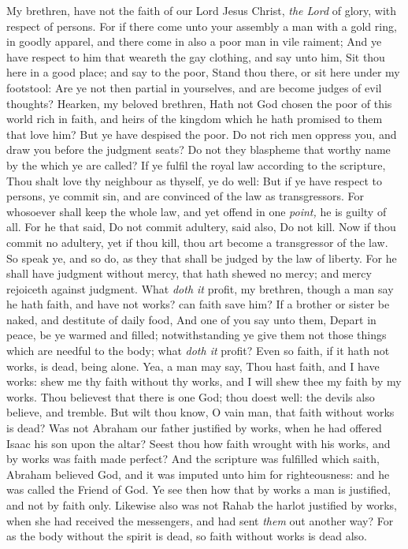 \documentclass[11pt,letterpaper,oneside]{memoir}
\begin{document}
My brethren, have not the faith of our Lord Jesus Christ, \emph{the Lord} of 
glory, with respect of persons. For if there come unto your assembly a 
man with a gold ring, in goodly apparel, and there come in also a poor 
man in vile raiment; And ye have respect to him that weareth the gay 
clothing, and say unto him, Sit thou here in a good place; and say to 
the poor, Stand thou there, or sit here under my footstool: Are ye not 
then partial in yourselves, and are become judges of evil thoughts? 
Hearken, my beloved brethren, Hath not God chosen the poor of this world 
rich in faith, and heirs of the kingdom which he hath promised to them 
that love him? But ye have despised the poor. Do not rich men oppress 
you, and draw you before the judgment seats? Do not they blaspheme that 
worthy name by the which ye are called? If ye fulfil the royal law 
according to the scripture, Thou shalt love thy neighbour as thyself, ye 
do well: But if ye have respect to persons, ye commit sin, and are 
convinced of the law as transgressors. For whosoever shall keep the 
whole law, and yet offend in one \emph{point,} he is guilty of all. For he 
that said, Do not commit adultery, said also, Do not kill. Now if thou 
commit no adultery, yet if thou kill, thou art become a transgressor of 
the law. So speak ye, and so do, as they that shall be judged by the law 
of liberty. For he shall have judgment without mercy, that hath shewed 
no mercy; and mercy rejoiceth against judgment. What \emph{doth it} profit, 
my brethren, though a man say he hath faith, and have not works? can 
faith save him? If a brother or sister be naked, and destitute of daily 
food, And one of you say unto them, Depart in peace, be ye warmed and 
filled; notwithstanding ye give them not those things which are needful 
to the body; what \emph{doth it} profit? Even so faith, if it hath not works, 
is dead, being alone. Yea, a man may say, Thou hast faith, and I have 
works: shew me thy faith without thy works, and I will shew thee my 
faith by my works. Thou believest that there is one God; thou doest 
well: the devils also believe, and tremble. But wilt thou know, O vain 
man, that faith without works is dead? Was not Abraham our father 
justified by works, when he had offered Isaac his son upon the altar? 
Seest thou how faith wrought with his works, and by works was faith made 
perfect? And the scripture was fulfilled which saith, Abraham believed 
God, and it was imputed unto him for righteousness: and he was called 
the Friend of God. Ye see then how that by works a man is justified, and 
not by faith only. Likewise also was not Rahab the harlot justified by 
works, when she had received the messengers, and had sent \emph{them} out 
another way? For as the body without the spirit is dead, so faith 
without works is dead also. 
\end{document}
